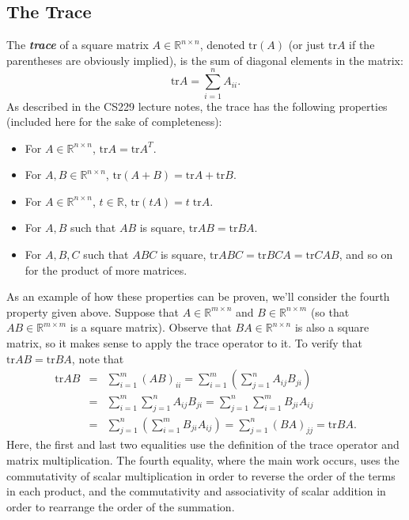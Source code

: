 \documentclass[12pt]{article}
\begin{document}
\subsection{The Trace}
The \textbf{\textit{trace}} of a square matrix $A \in \mathbb{R}^{n
  \times n}$, denoted $\mathrm{tr}(A)$ (or just $\mathrm{tr}A$ if the
  parentheses are obviously implied), is the
sum of diagonal elements in the matrix: 
\[\mathrm{tr}A = \sum_{i=1}^n A_{ii}.\]
As described in the CS229 lecture notes, the trace has the following
properties (included here for the sake of completeness):
\begin{itemize}
\item For $A \in \mathbb{R}^{n \times n}$, $\mathrm{tr}A =
  \mathrm{tr}A^T$.
\item For $A,B \in \mathbb{R}^{n \times n}$, $\mathrm{tr}(A + B) =
  \mathrm{tr}A + \mathrm{tr}B$.
\item For $A \in \mathbb{R}^{n \times n}$, $t \in \mathbb{R}$,
  $\mathrm{tr}(tA) = t \; \mathrm{tr}A$.
\item For $A,B$ such that $AB$ is square, $\mathrm{tr}AB =
  \mathrm{tr}BA$.
\item For $A,B,C$ such that $ABC$ is square, $\mathrm{tr}ABC =
  \mathrm{tr}BCA = \mathrm{tr}CAB$, and so on for the product of
  more matrices.
\end{itemize}

As an example of how these properties can be proven, we'll consider the
fourth property given above.  Suppose that $A \in \mathbb{R}^{m \times n}$
and $B \in \mathbb{R}^{n \times m}$ (so that $AB \in \mathbb{R}^{m \times m}$ is a square matrix).
Observe that $BA \in \mathbb{R}^{n \times n}$ is also a square matrix, so it makes sense
to apply the trace operator to it.  To verify that $\mathrm{tr} AB = \mathrm{tr} BA$, note that
\begin{eqnarray*}
  \mathrm{tr} AB &=& \sum_{i=1}^m (AB)_{ii} = \sum_{i=1}^m \left(\sum_{j=1}^n A_{ij} B_{ji} \right) \\
  &=& \sum_{i=1}^m \sum_{j=1}^n A_{ij} B_{ji} = \sum_{j=1}^n \sum_{i=1}^m B_{ji} A_{ij} \\
  &=& \sum_{j=1}^n \left(\sum_{i=1}^m B_{ji} A_{ij}\right) = \sum_{j=1}^n (BA)_{jj} = \mathrm{tr} BA.
\end{eqnarray*}
Here, the first and last two equalities use the definition of the trace operator and matrix multiplication.
The fourth equality, where the main work occurs, uses the commutativity of scalar multiplication in order
to reverse the order of the terms in each product, and the commutativity and associativity of scalar addition
in order to rearrange the order of the summation.
\end{document}
